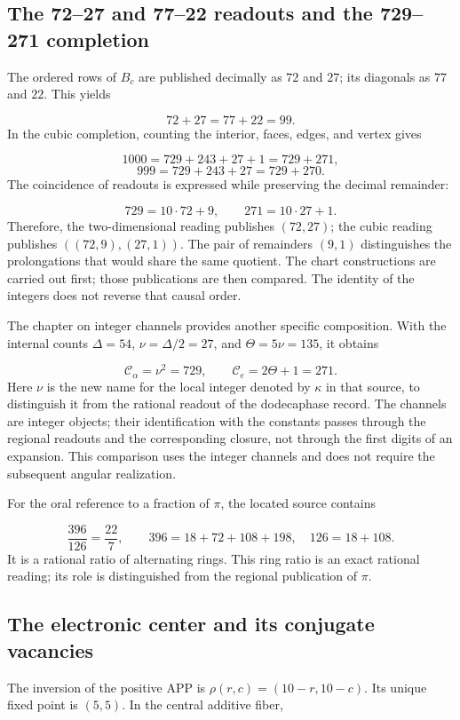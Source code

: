 \subsection{The 72–27 and 77–22 readouts and the 729–271 completion}
The ordered rows of \(B_c\) are published decimally as \(72\) and \(27\); its diagonals as \(77\) and \(22\). This yields

\[
72+27=77+22=99.
\]
In the cubic completion, counting the interior, faces, edges, and vertex gives

\[
1000=729+243+27+1=729+271,
\]
\[
999=729+243+27=729+270.
\]
The coincidence of readouts is expressed while preserving the decimal remainder:

\[
729=10\cdot72+9,\qquad271=10\cdot27+1.
\]
Therefore, the two-dimensional reading publishes \((72,27)\); the cubic reading publishes \(((72,9),(27,1))\). The pair of remainders \((9,1)\) distinguishes the prolongations that would share the same quotient. The chart constructions are carried out first; those publications are then compared. The identity of the integers does not reverse that causal order.

The chapter on integer channels provides another specific composition. With the internal counts \(\Delta=54\), \(\nu=\Delta/2=27\), and \(\Theta=5\nu=135\), it obtains

\[
\mathcal C_\alpha=\nu^2=729,
\qquad \mathcal C_e=2\Theta+1=271.
\]
Here \(\nu\) is the new name for the local integer denoted by \(\kappa\) in that source, to distinguish it from the rational readout of the dodecaphase record. The channels are integer objects; their identification with the constants passes through the regional readouts and the corresponding closure, not through the first digits of an expansion. This comparison uses the integer channels and does not require the subsequent angular realization.

For the oral reference to a fraction of \(\pi\), the located source contains

\[
\frac{396}{126}=\frac{22}{7},\qquad
396=18+72+108+198,\quad126=18+108.
\]
It is a rational ratio of alternating rings. This ring ratio is an exact rational reading; its role is distinguished from the regional publication of \(\pi\).

\subsection{The electronic center and its conjugate vacancies}
The inversion of the positive APP is \(\rho(r,c)=(10-r,10-c)\). Its unique fixed point is \((5,5)\). In the central additive fiber,

